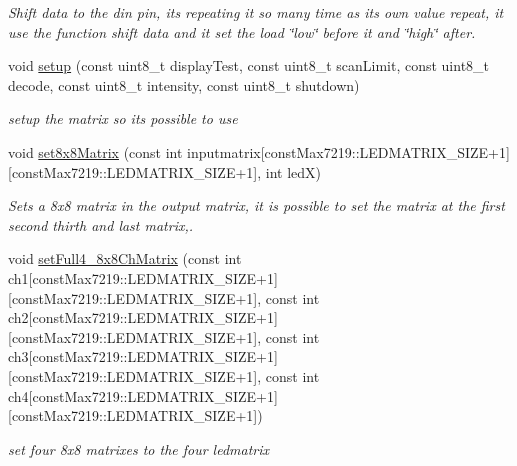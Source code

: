 \begin{DoxyCompactItemize}
\begin{DoxyCompactList}\small\item\em Shift data to the din pin, its repeating it so many time as it\textquotesingle{}s own value repeat, it use the function shift data and it set the load \char`\"{}low\char`\"{} before it and \char`\"{}high\char`\"{} after. \end{DoxyCompactList}\item 
void \hyperlink{classlight_music_1_1max7219_a33e75f73d1dd7c12ade3ee9d28bcdca7}{setup} (const uint8\+\_\+t display\+Test, const uint8\+\_\+t scan\+Limit, const uint8\+\_\+t decode, const uint8\+\_\+t intensity, const uint8\+\_\+t shutdown)
\begin{DoxyCompactList}\small\item\em setup the matrix so its possible to use \end{DoxyCompactList}\item 
void \hyperlink{classlight_music_1_1max7219_aad2aed3a52ed6c26ab907d05f3740b7e}{set8x8\+Matrix} (const int inputmatrix\mbox{[}const\+Max7219\+::\+L\+E\+D\+M\+A\+T\+R\+I\+X\+\_\+\+S\+I\+ZE+1\mbox{]}\mbox{[}const\+Max7219\+::\+L\+E\+D\+M\+A\+T\+R\+I\+X\+\_\+\+S\+I\+ZE+1\mbox{]}, int ledX)
\begin{DoxyCompactList}\small\item\em Sets a 8x8 matrix in the output matrix, it is possible to set the matrix at the first second thirth and last matrix,. \end{DoxyCompactList}\item 
void \hyperlink{classlight_music_1_1max7219_aab6d44530bb37580982654432e9171c8}{set\+Full4\+\_\+8x8\+Ch\+Matrix} (const int ch1\mbox{[}const\+Max7219\+::\+L\+E\+D\+M\+A\+T\+R\+I\+X\+\_\+\+S\+I\+ZE+1\mbox{]}\mbox{[}const\+Max7219\+::\+L\+E\+D\+M\+A\+T\+R\+I\+X\+\_\+\+S\+I\+ZE+1\mbox{]}, const int ch2\mbox{[}const\+Max7219\+::\+L\+E\+D\+M\+A\+T\+R\+I\+X\+\_\+\+S\+I\+ZE+1\mbox{]}\mbox{[}const\+Max7219\+::\+L\+E\+D\+M\+A\+T\+R\+I\+X\+\_\+\+S\+I\+ZE+1\mbox{]}, const int ch3\mbox{[}const\+Max7219\+::\+L\+E\+D\+M\+A\+T\+R\+I\+X\+\_\+\+S\+I\+ZE+1\mbox{]}\mbox{[}const\+Max7219\+::\+L\+E\+D\+M\+A\+T\+R\+I\+X\+\_\+\+S\+I\+ZE+1\mbox{]}, const int ch4\mbox{[}const\+Max7219\+::\+L\+E\+D\+M\+A\+T\+R\+I\+X\+\_\+\+S\+I\+ZE+1\mbox{]}\mbox{[}const\+Max7219\+::\+L\+E\+D\+M\+A\+T\+R\+I\+X\+\_\+\+S\+I\+ZE+1\mbox{]})
\begin{DoxyCompactList}\small\item\em set four 8x8 matrixes to the four ledmatrix \end{DoxyCompactList}\item 

\end{DoxyCompactItemize}
